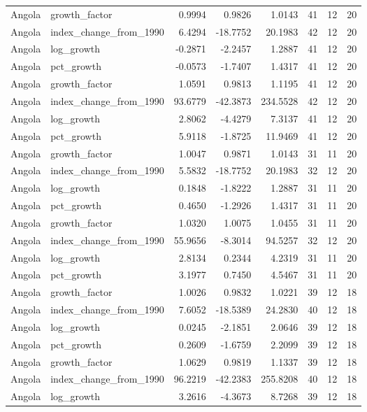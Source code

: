 \begin{table}
\begin{tabular}[t]{llrrrrrr}
\addlinespace
Angola & growth\_factor & 0.9994 & 0.9826 & 1.0143 & 41 & 12 & 20\\
Angola & index\_change\_from\_1990 & 6.4294 & -18.7752 & 20.1983 & 42 & 12 & 20\\
Angola & log\_growth & -0.2871 & -2.2457 & 1.2887 & 41 & 12 & 20\\
Angola & pct\_growth & -0.0573 & -1.7407 & 1.4317 & 41 & 12 & 20\\
Angola & growth\_factor & 1.0591 & 0.9813 & 1.1195 & 41 & 12 & 20\\
\addlinespace
Angola & index\_change\_from\_1990 & 93.6779 & -42.3873 & 234.5528 & 42 & 12 & 20\\
Angola & log\_growth & 2.8062 & -4.4279 & 7.3137 & 41 & 12 & 20\\
Angola & pct\_growth & 5.9118 & -1.8725 & 11.9469 & 41 & 12 & 20\\
Angola & growth\_factor & 1.0047 & 0.9871 & 1.0143 & 31 & 11 & 20\\
Angola & index\_change\_from\_1990 & 5.5832 & -18.7752 & 20.1983 & 32 & 12 & 20\\
\addlinespace
Angola & log\_growth & 0.1848 & -1.8222 & 1.2887 & 31 & 11 & 20\\
Angola & pct\_growth & 0.4650 & -1.2926 & 1.4317 & 31 & 11 & 20\\
Angola & growth\_factor & 1.0320 & 1.0075 & 1.0455 & 31 & 11 & 20\\
Angola & index\_change\_from\_1990 & 55.9656 & -8.3014 & 94.5257 & 32 & 12 & 20\\
Angola & log\_growth & 2.8134 & 0.2344 & 4.2319 & 31 & 11 & 20\\
\addlinespace
Angola & pct\_growth & 3.1977 & 0.7450 & 4.5467 & 31 & 11 & 20\\
Angola & growth\_factor & 1.0026 & 0.9832 & 1.0221 & 39 & 12 & 18\\
Angola & index\_change\_from\_1990 & 7.6052 & -18.5389 & 24.2830 & 40 & 12 & 18\\
Angola & log\_growth & 0.0245 & -2.1851 & 2.0646 & 39 & 12 & 18\\
Angola & pct\_growth & 0.2609 & -1.6759 & 2.2099 & 39 & 12 & 18\\
\addlinespace
Angola & growth\_factor & 1.0629 & 0.9819 & 1.1337 & 39 & 12 & 18\\
Angola & index\_change\_from\_1990 & 96.2219 & -42.2383 & 255.8208 & 40 & 12 & 18\\
Angola & log\_growth & 3.2616 & -4.3673 & 8.7268 & 39 & 12 & 18\\

\end{tabular}
\end{table}

